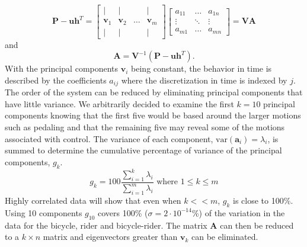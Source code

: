 \documentclass[smallextended]{svjour3}     %
\begin{document}
\begin{equation}
    \mathbf{P}-\mathbf{u}\mathbf{h}^T=
    \left[\begin{array}{cccc}
        | & | & & |\\
        \mathbf{v}_1 & \mathbf{v}_2 & \ldots & \mathbf{v}_m\\
        | & | & & |
    \end{array}\right]
    \left[\begin{array}{ccc}
    a_{11} & \ldots & a_{1n}\\
    \vdots & \ddots & \vdots\\
    a_{m1} & \ldots & a_{mn}
    \end{array}\right]
    =\mathbf{V}\mathbf{A}
\end{equation}
and
\begin{equation}
    \mathbf{A}=\mathbf{V}^{-1}(\mathbf{P}-\mathbf{u}\mathbf{h}^T)\textrm{.}
\end{equation}
With the principal components $\mathbf{v}_i$ being constant, the behavior in
time is described by the coefficients $a_{ij}$ where the discretization in time
is indexed by $j$. The order of the system can be reduced by eliminating
principal components that have little variance. We arbitrarily decided to
examine the first $k=10$ principal components knowing that the first five would
be based around the larger motions such as pedaling and that the remaining five
may reveal some of the motions associated with control. The variance of each
component, $\textrm{var}(\mathbf{a}_i)=\lambda_i$, is summed to determine the
cumulative percentage of variance of the principal components, $g_k$.
\begin{equation}
    g_k=100\frac{\sum_{i=1}^k\lambda_i}{\sum_{i=1}^m\lambda_i}\textrm{ where }1\leq k\leq m
\end{equation}
Highly correlated data will show that even when $k<<m$, $g_k$ is close to
100\%. Using 10 components $g_{10}$ covers 100\% ($\sigma=2\cdot10^{-14}$\%) of
the variation in the data for the bicycle, rider and bicycle-rider. The matrix
$\mathbf{A}$ can then be reduced to a $k\times n$ matrix and eigenvectors
greater than $\mathbf{v}_k$ can be eliminated.
\end{document}
